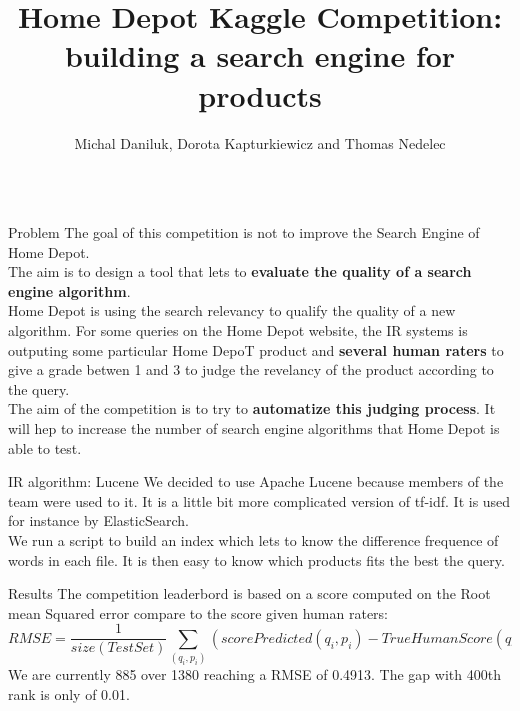 \documentclass{beamer}
\title{Home Depot Kaggle Competition: building a search engine for products}
\author{Michal Daniluk, Dorota Kapturkiewicz and Thomas Nedelec}
\institute{%
  Department of Computing Science,
  University College London
}
\newlength\postercolumnwidth
\newlength\totalwidth
\begin{document}
\begin{frame}[t]{}
\centering
\begin{columns}[totalwidth=\totalwidth]
  \begin{column}[t]{\postercolumnwidth}
    \centering
    \begin{block}{Problem}
\small
 The goal of this competition is not to improve the Search Engine of Home Depot. 
\\ The aim is to design a tool that lets to \textbf{evaluate the quality of a search engine algorithm}. \\Home Depot is using the search relevancy to qualify the quality of a new algorithm. For some queries on the Home Depot website, the IR systems is outputing some particular Home DepoT product and \textbf{several human raters} to give a grade betwen 1 and 3 to judge the revelancy of the product according to the query. 
\\The aim of the competition is to try to \textbf{automatize this judging process}. It will hep to increase the number of search engine algorithms that Home Depot is able to test.
    \end{block}
    \begin{block}{IR algorithm: Lucene}
We decided to use Apache Lucene because members of the team were used to it. It is a little bit more complicated version of tf-idf. It is used for instance by ElasticSearch.
\\ We run a script to build an index which lets to know the difference frequence of words in each file. It is then easy to know which products fits the best the query.



    \end{block}
\begin{block}{Results}
\small
      The competition leaderbord is based on a score computed on the Root mean Squared error compare to the score given human raters:
\begin{equation}
RMSE=\frac{1}{size(TestSet)} \sum_{(q_{i},p_{i})} (scorePredicted(q_{i},p_{i})-TrueHumanScore(q_{i},p_{i}))^{2}
\end{equation}
We are currently 885 over 1380 reaching a RMSE of 0.4913. The gap with 400th rank is only of 0.01.
    \end{block}
\end{column} 
    

\end{columns}
\end{frame}
\end{document}

